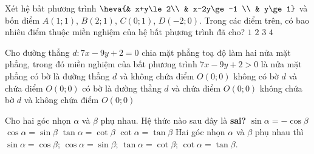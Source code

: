 \begin{ex}%
Xét hệ bất phương trình $\heva{& x+y\le 2\\ & x-2y\ge -1 \\ & y\ge 1}$ và bốn điểm $A(1;1)$, $B(2;1)$, $C(0;1)$, $D(-2;0)$. Trong các điểm trên, có bao nhiêu điểm thuộc miền nghiệm của hệ bất phương trình đã cho?
\choice
{\True $1$}
{$2$}
{$3$}
{$4$}
\end{ex}

\begin{ex}%
Cho đường thẳng $d\colon 7x-9y+2=0$ chia mặt phẳng toạ độ làm hai nửa  mặt phẳng, trong đó miền nghiệm của bất phương trình $7x-9y+2>0$ là nửa mặt phẳng
\choice
{có bờ là đường thẳng $d$ và không chứa điểm $O(0;0)$}
{\True không có bờ $d$ và chứa điểm $O(0;0)$}
{có bờ là đường thẳng $d$ và chứa điểm $O(0;0)$}
{không chứa bờ $d$ và không chứa điểm $O(0;0)$}
\end{ex}

\begin{ex}%
Cho hai góc nhọn $\alpha $ và $\beta $ phụ nhau. Hệ thức nào sau đây là \textbf{sai?}
\choice
{\True $\sin \alpha =-\cos \beta $}
{$\cos \alpha =\sin \beta $}
{$\tan \alpha =\cot \beta $}
{$\cot \alpha =\tan \beta $}
\loigiai
{Hai góc nhọn $\alpha $ và $\beta $ phụ nhau thì $\sin \alpha =\cos \beta$;  $\cos\alpha =\sin\beta$; $\tan\alpha =\cot\beta$; $\cot \alpha =\tan\beta $.}
\end{ex}

